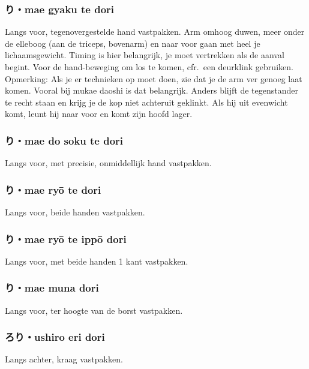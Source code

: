 \subsubsection{り・mae gyaku te dori}
Langs voor, tegenovergestelde hand vastpakken. Arm omhoog duwen, meer onder de elleboog (aan de triceps, bovenarm) en naar voor gaan met heel je lichaamsgewicht. Timing is hier belangrijk, je moet vertrekken als de aanval begint. Voor de hand-beweging om los te komen, cfr.\ een deurklink gebruiken.\\
Opmerking: Als je er technieken op moet doen, zie dat je de arm ver genoeg laat komen. Vooral bij mukae daoshi is dat belangrijk. Anders blijft de tegenstander te recht staan en krijg je de kop niet achteruit geklinkt. Als hij uit evenwicht komt, leunt hij naar voor en komt zijn hoofd lager.

\subsubsection{り・mae do soku te dori}
Langs voor, met precisie, onmiddellijk hand vastpakken.

\subsubsection{り・mae ry\={o} te dori}
Langs voor, beide handen vastpakken.

\subsubsection{り・mae ry\={o} te ipp\={o} dori}
Langs voor, met beide handen 1 kant vastpakken.

\subsubsection{り・mae muna dori}
Langs voor, ter hoogte van de borst vastpakken.

\subsubsection{ろり・ushiro eri dori}
Langs achter, kraag vastpakken.

